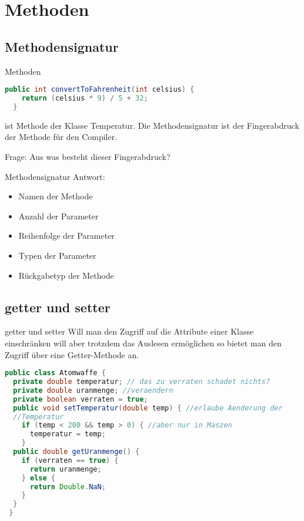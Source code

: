 \documentclass[18pt]{beamer}
\begin{document}
\section{Methoden}
\subsection{Methodensignatur}
\begin{frame}[fragile]{Methoden}
 \begin{lstlisting}[language=java]
  public int convertToFahrenheit(int celsius) {
    return (celsius * 9) / 5 + 32;
  }
 \end{lstlisting}
 ist Methode der Klasse Temperatur. Die Methodensignatur ist der Fingerabdruck der Methode für den Compiler.
 
 Frage: Aus was besteht dieser Fingerabdruck?
\end{frame}

\begin{frame}{Methodensignatur}
Antwort:
 \begin{itemize}
  \item Namen der Methode
  \item Anzahl der Parameter
  \item Reihenfolge der Parameter
  \item Typen der Parameter
  \item Rückgabetyp der Methode
 \end{itemize}

\end{frame}

\subsection{getter und setter}
\begin{frame}[fragile]{getter und setter}
Will man den Zugriff auf die Attribute einer Klasse einschränken will aber trotzdem das Auslesen ermöglichen so bietet man den Zugriff über eine Getter-Methode an.
\begin{lstlisting}[language=java]
 public class Atomwaffe {
  private double temperatur; // das zu verraten schadet nichts?
  private double uranmenge; //veraendern 
  private boolean verraten = true;
  public void setTemperatur(double temp) { //erlaube Aenderung der 
  //Temperatur
    if (temp < 200 && temp > 0) { //aber nur in Maszen
      temperatur = temp;
    }
  public double getUranmenge() {
    if (verraten == true) {
      return uranmenge;
    } else {
      return Double.NaN;
    }
  }
 }
\end{lstlisting}
\end{frame}
\end{document}
